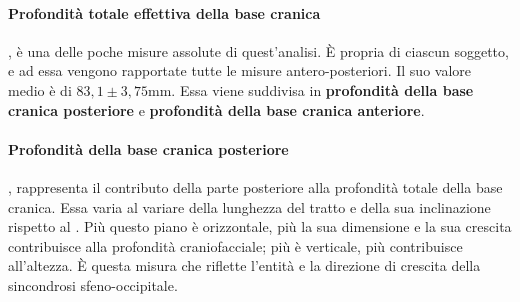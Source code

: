 \paragraph{Profondità totale effettiva della base cranica} , è una delle poche misure assolute di quest'analisi. È propria di ciascun soggetto, e ad essa vengono rapportate tutte le misure antero-posteriori. Il suo valore medio è di $83,1 \pm 3,75$mm. Essa viene suddivisa in \textbf{profondità della base cranica posteriore} e \textbf{profondità della base cranica anteriore}.

\paragraph{Profondità della base cranica posteriore} , rappresenta il contributo della parte posteriore alla profondità totale della base cranica. Essa varia al variare della lunghezza del tratto  e della sua inclinazione rispetto al . Più questo piano è orizzontale, più la sua dimensione e la sua crescita contribuisce alla profondità craniofacciale; più è verticale, più contribuisce all'altezza. È questa misura che riflette l'entità e la direzione di crescita della sincondrosi sfeno-occipitale.

